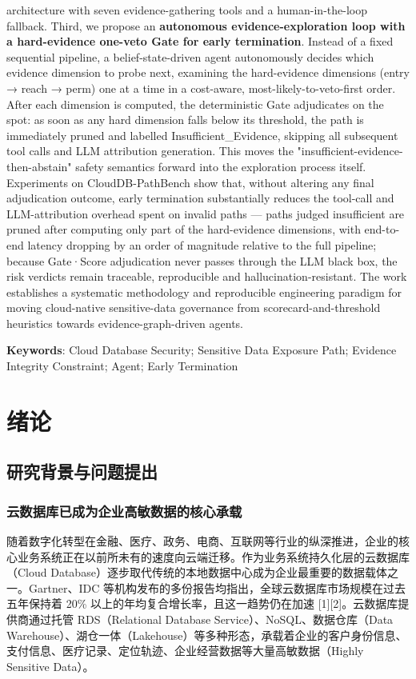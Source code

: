 \documentclass[a4paper,12pt]{ctexart}
\begin{document}
architecture with seven evidence-gathering tools and a human-in-the-loop fallback. Third, we propose an \textbf{autonomous evidence-exploration loop with a hard-evidence one-veto Gate for early termination}. Instead of a fixed sequential pipeline, a belief-state-driven agent autonomously decides which evidence dimension to probe next, examining the hard-evidence dimensions (entry → reach → perm) one at a time in a cost-aware, most-likely-to-veto-first order. After each dimension is computed, the deterministic Gate adjudicates on the spot: as soon as any hard dimension falls below its threshold, the path is immediately pruned and labelled Insufficient\_Evidence, skipping all subsequent tool calls and LLM attribution generation. This moves the "insufficient-evidence-then-abstain" safety semantics forward into the exploration process itself. Experiments on CloudDB-PathBench show that, without altering any final adjudication outcome, early termination substantially reduces the tool-call and LLM-attribution overhead spent on invalid paths — paths judged insufficient are pruned after computing only part of the hard-evidence dimensions, with end-to-end latency dropping by an order of magnitude relative to the full pipeline; because Gate·Score adjudication never passes through the LLM black box, the risk verdicts remain traceable, reproducible and hallucination-resistant. The work establishes a systematic methodology and reproducible engineering paradigm for moving cloud-native sensitive-data governance from scorecard-and-threshold heuristics towards evidence-graph-driven agents.

\textbf{Keywords}: Cloud Database Security; Sensitive Data Exposure Path; Evidence Integrity Constraint; Agent; Early Termination


\section{绪论}

\subsection{研究背景与问题提出}

\subsubsection{云数据库已成为企业高敏数据的核心承载}

随着数字化转型在金融、医疗、政务、电商、互联网等行业的纵深推进，企业的核心业务系统正在以前所未有的速度向云端迁移。作为业务系统持久化层的云数据库（Cloud Database）逐步取代传统的本地数据中心成为企业最重要的数据载体之一。Gartner、IDC 等机构发布的多份报告均指出，全球云数据库市场规模在过去五年保持着 20\% 以上的年均复合增长率，且这一趋势仍在加速 [1][2]。云数据库提供商通过托管 RDS（Relational Database Service）、NoSQL、数据仓库（Data Warehouse）、湖仓一体（Lakehouse）等多种形态，承载着企业的客户身份信息、支付信息、医疗记录、定位轨迹、企业经营数据等大量高敏数据（Highly Sensitive Data）。
\end{document}
